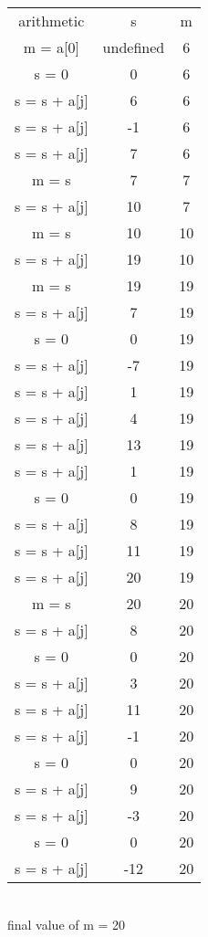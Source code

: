 \documentclass[letterpaper]{article}
\begin{document}
    \section{}
    	\subsection{}
            \begin{tabular}{ccc}
                arithmetic & s & m\\
                m = a[0] & undefined & 6\\
                s = 0 & 0 & 6\\
                s = s + a[j] & 6 & 6\\
                s = s + a[j] & -1 & 6\\
                s = s + a[j] & 7 & 6\\
                m = s & 7 & 7\\
                s = s + a[j] & 10 & 7\\
                m = s & 10 & 10\\
                s = s + a[j] & 19 & 10\\
                m = s & 19 & 19\\
                s = s + a[j] & 7 & 19\\
                s = 0 & 0 & 19\\
                s = s + a[j] & -7 & 19\\
                s = s + a[j] & 1 & 19\\
                s = s + a[j] & 4 & 19\\
                s = s + a[j] & 13 & 19\\
                s = s + a[j] & 1 & 19\\
                s = 0 & 0 & 19\\
                s = s + a[j] & 8 & 19\\
                s = s + a[j] & 11 & 19\\
                s = s + a[j] & 20 & 19\\
                m = s & 20 & 20\\
                s = s + a[j] & 8 & 20\\
                s = 0 & 0 & 20\\
                s = s + a[j] & 3 & 20\\
                s = s + a[j] & 11 & 20\\
                s = s + a[j] & -1 & 20\\
                s = 0 & 0 & 20\\
                s = s + a[j] & 9 & 20\\
                s = s + a[j] & -3 & 20\\
                s = 0 & 0 & 20\\
                s = s + a[j] & -12 & 20\\
            \end{tabular}\\
            final value of m = 20
\end{document}
